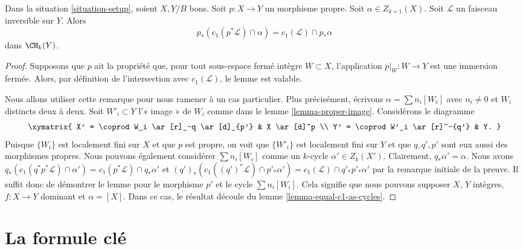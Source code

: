 \begin{lemma}
\label{lemma-pushforward-cap-c1}
Dans la situation \ref{situation-setup}, soient $X, Y/B$ bons. Soit $p :
X \to Y$ un morphisme propre. Soit $\alpha \in Z_{k + 1}(X)$. Soit
$\mathcal{L}$ un faisceau inversible sur $Y$. Alors
$$
p_*(c_1(p^*\mathcal{L}) \cap \alpha) = c_1(\mathcal{L}) \cap p_*\alpha
$$
dans $\CH_k(Y)$.
\end{lemma}

\begin{proof}
Supposons que $p$ ait la propriété que, pour tout sous-espace fermé intègre
$W \subset X$, l'application $p|_W : W \to Y$ est une immersion fermée.
Alors, par définition de l'intersection avec $c_1(\mathcal{L})$, le lemme est
valable.

\medskip\noindent
Nous allons utiliser cette remarque pour nous ramener à un cas particulier. Plus précisément,
écrivons $\alpha = \sum n_i[W_i]$ avec $n_i \not = 0$ et $W_i$ distincts deux à
deux. Soit $W'_i \subset Y$ l'« image » de $W_i$ comme dans le lemme
\ref{lemma-proper-image}. Considérons le diagramme
$$
\xymatrix{
X' = \coprod W_i \ar[r]_-q \ar[d]_{p'} & X \ar[d]^p \\
Y' = \coprod W'_i \ar[r]^-{q'} & Y.
}
$$
Puisque $\{W_i\}$ est localement fini sur $X$ et que $p$ est propre, on voit
que $\{W'_i\}$ est localement fini sur $Y$ et que $q, q', p'$ sont eux aussi
des morphismes propres. Nous pouvons également considérer $\sum n_i[W_i]$
comme un $k$-cycle $\alpha' \in Z_k(X')$. Clairement, $q_*\alpha' = \alpha$.
Nous avons $q_*(c_1(q^*p^*\mathcal{L}) \cap \alpha') = c_1(p^*\mathcal{L})
\cap q_*\alpha'$ et $(q')_*(c_1((q')^*\mathcal{L}) \cap p'_*\alpha') =
c_1(\mathcal{L}) \cap q'_*p'_*\alpha'$ par la remarque initiale de la preuve.
Il suffit donc de démontrer le lemme pour le morphisme $p'$ et le cycle $\sum
n_i[W_i]$. Cela signifie que nous pouvons supposer $X$, $Y$
intègres, $f : X \to Y$ dominant et $\alpha = [X]$. Dans ce cas, le résultat
découle du lemme \ref{lemma-equal-c1-as-cycles}.
\end{proof}













\section{La formule clé}
\label{section-key}

